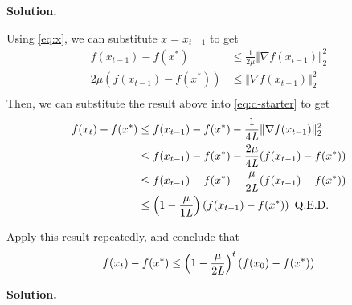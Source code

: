 \documentclass{exam}
\begin{document}
\begin{questions}
\begin{parts}
{            \textbf{Solution.}

            Using \eqref{eq:x}, we can substitute $x = x_{t - 1}$ to get
            \begin{align*}
                f(x_{t - 1}) - f(x^*)        & \leq \frac{1}{2\mu}\Vert \nabla f(x_{t - 1}) \Vert_2^2 \\
                2 \mu(f(x_{t - 1}) - f(x^*)) & \leq \Vert \nabla f(x_{t - 1}) \Vert_2^2               \\
            \end{align*}
            Then, we can substitute the result above into \eqref{eq:d-starter} to get
            \begin{align*}
                f(x_t) - f(x^*) & \leq f(x_{t - 1}) - f(x^*) - \frac{1}{4\emph{L}} \Vert \nabla f(x_{t - 1}) \Vert_2^2         \\
                                & \leq f(x_{t - 1}) - f(x^*) - \frac{2\mu}{4\emph{L}} (f(x_{t - 1}) - f(x^*))                  \\
                                & \leq f(x_{t - 1}) - f(x^*) - \frac{\mu}{2\emph{L}} (f(x_{t - 1}) - f(x^*))                   \\
                                & \leq \left(1 - \frac{\mu}{1\emph{L}}\right)\left(f(x_{t - 1}) - f(x^*)\right) \text{ Q.E.D.}
            \end{align*}
        }

        \hr

        {
            Apply this result repeatedly, and conclude that
            \begin{equation}
                f(x_t) - f(x^*) \leq \left(1 - \frac{\mu}{2\emph{L}}\right)^t(f(x_0) - f(x^*))
            \end{equation}

            \textbf{Solution.}

}
\end{parts}
\end{questions}
\end{document}

